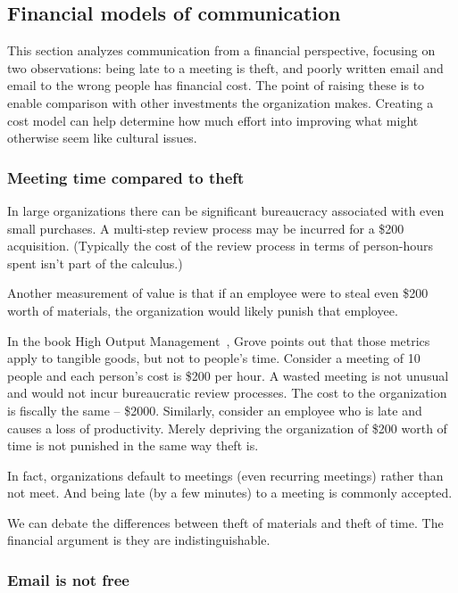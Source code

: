 \subsection*{Financial models of communication\label{sec:financial-models-of-communication}}

This section analyzes communication from a financial perspective, focusing on two observations:
being late to a meeting is theft, 
and poorly written email and email to the wrong people has financial cost.
The point of raising these is to enable comparison with other investments the organization makes. Creating a cost model can help determine how much effort into improving what might otherwise seem like cultural issues.

\subsubsection*{Meeting time compared to theft}

In large organizations there can be significant bureaucracy associated with even small purchases. A multi-step review process may be incurred for a \$200 acquisition. (Typically the cost of the review process in terms of person-hours spent isn't part of the calculus.)

Another measurement of value is that if an employee were to steal even \$200 worth of materials, the organization would likely punish that employee.

In the book High Output Management~\cite{1995_Grove}, Grove points out that those metrics apply to tangible goods, but not to people's time. Consider a meeting of 10 people and each person's cost is \$200 per hour. 
A wasted meeting is not unusual and would not incur bureaucratic review processes. The cost to the organization is fiscally the same -- \$2000. Similarly, consider an employee who is late and causes a loss of productivity. Merely depriving the organization of \$200 worth of time is not punished in the same way theft is.

In fact, organizations default to meetings (even recurring meetings) rather than not meet. And being late (by a few minutes) to a meeting is commonly accepted. 

We can debate the differences between theft of materials and theft of time. The financial argument is they are indistinguishable. 


\subsubsection*{Email is not free}

